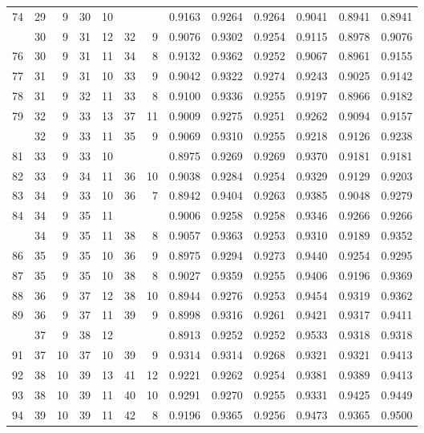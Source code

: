 \begin{Schunk}
\begin{longtable}{rrrrrrrrrrrrr}
74 & 29 & 9 & 30 & 10 &  &  & 0.9163 & 0.9264 & 0.9264 & 0.9041 & 0.8941 & 0.8941\\
\addlinespace
75 & 30 & 9 & 31 & 12 & 32 & 9 & 0.9076 & 0.9302 & 0.9254 & 0.9115 & 0.8978 & 0.9076\\
76 & 30 & 9 & 31 & 11 & 34 & 8 & 0.9132 & 0.9362 & 0.9252 & 0.9067 & 0.8961 & 0.9155\\
77 & 31 & 9 & 31 & 10 & 33 & 9 & 0.9042 & 0.9322 & 0.9274 & 0.9243 & 0.9025 & 0.9142\\
78 & 31 & 9 & 32 & 11 & 33 & 8 & 0.9100 & 0.9336 & 0.9255 & 0.9197 & 0.8966 & 0.9182\\
79 & 32 & 9 & 33 & 13 & 37 & 11 & 0.9009 & 0.9275 & 0.9251 & 0.9262 & 0.9094 & 0.9157\\
\addlinespace
80 & 32 & 9 & 33 & 11 & 35 & 9 & 0.9069 & 0.9310 & 0.9255 & 0.9218 & 0.9126 & 0.9238\\
81 & 33 & 9 & 33 & 10 &  &  & 0.8975 & 0.9269 & 0.9269 & 0.9370 & 0.9181 & 0.9181\\
82 & 33 & 9 & 34 & 11 & 36 & 10 & 0.9038 & 0.9284 & 0.9254 & 0.9329 & 0.9129 & 0.9203\\
83 & 34 & 9 & 33 & 10 & 36 & 7 & 0.8942 & 0.9404 & 0.9263 & 0.9385 & 0.9048 & 0.9279\\
84 & 34 & 9 & 35 & 11 &  &  & 0.9006 & 0.9258 & 0.9258 & 0.9346 & 0.9266 & 0.9266\\
\addlinespace
85 & 34 & 9 & 35 & 11 & 38 & 8 & 0.9057 & 0.9363 & 0.9253 & 0.9310 & 0.9189 & 0.9352\\
86 & 35 & 9 & 35 & 10 & 36 & 9 & 0.8975 & 0.9294 & 0.9273 & 0.9440 & 0.9254 & 0.9295\\
87 & 35 & 9 & 35 & 10 & 38 & 8 & 0.9027 & 0.9359 & 0.9255 & 0.9406 & 0.9196 & 0.9369\\
88 & 36 & 9 & 37 & 12 & 38 & 10 & 0.8944 & 0.9276 & 0.9253 & 0.9454 & 0.9319 & 0.9362\\
89 & 36 & 9 & 37 & 11 & 39 & 9 & 0.8998 & 0.9316 & 0.9261 & 0.9421 & 0.9317 & 0.9411\\
\addlinespace
90 & 37 & 9 & 38 & 12 &  &  & 0.8913 & 0.9252 & 0.9252 & 0.9533 & 0.9318 & 0.9318\\
91 & 37 & 10 & 37 & 10 & 39 & 9 & 0.9314 & 0.9314 & 0.9268 & 0.9321 & 0.9321 & 0.9413\\
92 & 38 & 10 & 39 & 13 & 41 & 12 & 0.9221 & 0.9262 & 0.9254 & 0.9381 & 0.9389 & 0.9413\\
93 & 38 & 10 & 39 & 11 & 40 & 10 & 0.9291 & 0.9270 & 0.9255 & 0.9331 & 0.9425 & 0.9449\\
94 & 39 & 10 & 39 & 11 & 42 & 8 & 0.9196 & 0.9365 & 0.9256 & 0.9473 & 0.9365 & 0.9500\\

\end{longtable}
\end{Schunk}
